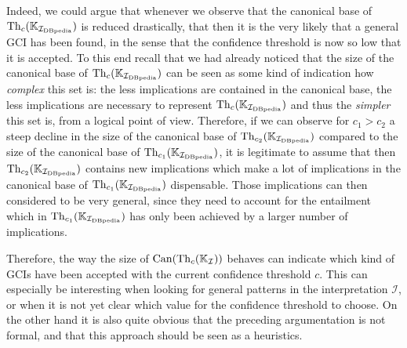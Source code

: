 Indeed, we could argue that whenever we observe that the canonical base of $\operatorname{Th}_c({\mathbb{K}}_{{\mathcal{I}_{\text{DBpedia}}}})$ is reduced drastically, that then it is the very likely that a general GCI
has been found, in the sense that the confidence threshold is now so low that it is
accepted.  To this end recall that we had already noticed that the size of the canonical
base of $\operatorname{Th}_c({\mathbb{K}}_{{\mathcal{I}_{\text{DBpedia}}}})$ can be seen as some kind of indication how
\emph{complex} this set is: the less implications are contained in the canonical base, the
less implications are necessary to represent $\operatorname{Th}_c({\mathbb{K}}_{\mathcal{I}_{\text{DBpedia}}})$ and thus the
\emph{simpler} this set is, from a logical point of view.  Therefore, if we can observe
for $c_1 > c_2$ a steep decline in the size of the canonical base of $\operatorname{Th}_{c_2}({\mathbb{K}}_{{\mathcal{I}_{\text{DBpedia}}}})$ compared to the size of the canonical base of $\operatorname{Th}_{c_1}({\mathbb{K}}_{{\mathcal{I}_{\text{DBpedia}}}})$, it is legitimate to assume that then $\operatorname{Th}_{c_2}({\mathbb{K}}_{{\mathcal{I}_{\text{DBpedia}}}})$
contains new implications which make a lot of implications in the canonical base of
$\operatorname{Th}_{c_1}({\mathbb{K}}_{\mathcal{I}_{\text{DBpedia}}})$ dispensable.  Those implications can then considered to be
very general, since they need to account for the entailment which in $\operatorname{Th}_{c_1}({\mathbb{K}}_{\mathcal{I}_{\text{DBpedia}}})$ has only been achieved by a larger number of implications.

Therefore, the way the size of $\operatorname{Can}(\operatorname{Th}_c({\mathbb{K}}_{\mathcal{I}}))$ behaves can indicate
which kind of GCIs have been accepted with the current confidence threshold $c$.  This can
especially be interesting when looking for general patterns in the interpretation
$\mathcal{I}$, or when it is not yet clear which value for the confidence threshold to
choose.  On the other hand it is also quite obvious that the preceding argumentation is
not formal, and that this approach should be seen as a heuristics.

